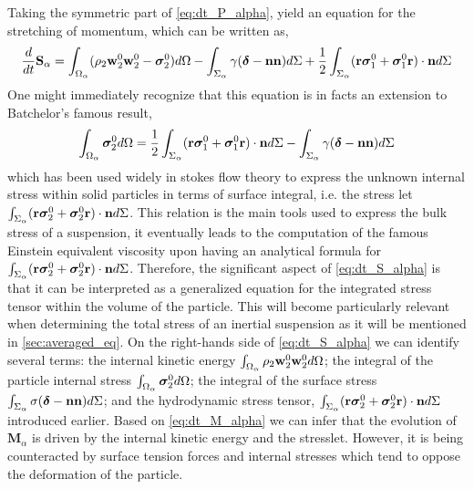 Taking the symmetric part of \ref{eq:dt_P_alpha}, yield an equation for the stretching of momentum, which can be written as,
\begin{equation}    
    \frac{d}{d t}{\textbf{S}_\alpha}
    =  \int_{\Omega_\alpha} 
        (\rho_2\textbf{w}_2^0 \textbf{w}_2^0
        - \bm{\sigma}_2^0) d\Omega
        - \int_{\Sigma_\alpha} \gamma(\bm\delta-\textbf{nn}) d\Sigma
        + \frac{1}{2}\int_{\Sigma_\alpha} (\textbf{r}\bm\sigma_1^0+ \bm\sigma_1^0\textbf{r})\cdot \textbf{n} d\Sigma
    \label{eq:dt_S_alpha}
\end{equation}
One might immediately recognize that this equation is in facts an extension to Batchelor’s famous result, 
\begin{equation*}
    \int_{\Omega_\alpha} \bm{\sigma}_2^0 d\Omega
    = \frac{1}{2}\int_{\Sigma_\alpha} (\textbf{r}\bm\sigma_1^0+ \bm\sigma_1^0\textbf{r})\cdot \textbf{n} d\Sigma
    - \int_{\Sigma_\alpha} \gamma(\bm\delta - \textbf{nn}) d\Sigma
\end{equation*}
which has been used widely in stokes flow theory to express the unknown internal stress within solid particles in terms of surface integral, i.e. the stress let $\int_{\Sigma_\alpha} (\textbf{r}\bm\sigma_2^0+ \bm\sigma_2^0\textbf{r})\cdot \textbf{n} d\Sigma$.
This relation is the main tools used to express the bulk stress of a suspension, it eventually leads to the computation of the famous Einstein equivalent viscosity upon having an analytical formula for $\int_{\Sigma_\alpha} (\textbf{r}\bm\sigma_2^0+ \bm\sigma_2^0\textbf{r})\cdot \textbf{n} d\Sigma$. 
Therefore, the significant aspect of \ref{eq:dt_S_alpha} is that it can be interpreted as a generalized equation for the integrated stress tensor within the volume of the particle.
This will become particularly relevant when determining the total stress of an inertial suspension as it will be mentioned in \ref{sec:averaged_eq}.
On the right-hands side of \ref{eq:dt_S_alpha} we can identify several terms: 
the internal kinetic energy $\int_{\Omega_\alpha} \rho_2\textbf{w}_2^0\textbf{w}_2^0  d\Omega$; 
the integral of the particle internal stress $\int_{\Omega_\alpha}  \bm{\sigma}_2^0
  d\Omega$; 
the integral of the surface stress $\int_{\Sigma_\alpha}  \sigma (\bm\delta- \textbf{nn})  d\Sigma$; 
and the hydrodynamic stress tensor, $\int_{\Sigma_\alpha} (\textbf{r}\bm\sigma_2^0+ \bm\sigma_2^0\textbf{r})\cdot \textbf{n} d\Sigma$ introduced earlier.
Based on \ref{eq:dt_M_alpha} we can infer that the evolution of $\textbf{M}_\alpha$ is driven by the internal kinetic energy and the stresslet.
However, it is being counteracted by surface tension forces and internal stresses which tend to oppose the deformation of the particle. 
